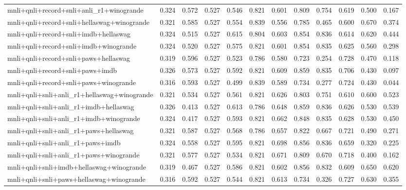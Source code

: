 \begin{table}[t]
\begin{tabular}{lrrrrrrrrrrr}
    mnli+qnli+record+snli+anli\_r1+winogrande & 0.324 & 0.572 & 0.527 & 0.546 & 0.821 & 0.601 & 0.809 & 0.754 & 0.619 & 0.500 & 0.167 \\
    mnli+qnli+record+snli+hellaswag+winogrande & 0.321 & 0.585 & 0.527 & 0.554 & 0.839 & 0.556 & 0.785 & 0.465 & 0.600 & 0.670 & 0.374 \\
    mnli+qnli+record+snli+imdb+hellaswag & 0.324 & 0.515 & 0.527 & 0.615 & 0.804 & 0.603 & 0.854 & 0.836 & 0.614 & 0.620 & 0.444 \\
    mnli+qnli+record+snli+imdb+winogrande & 0.324 & 0.520 & 0.527 & 0.575 & 0.821 & 0.601 & 0.854 & 0.835 & 0.625 & 0.560 & 0.298 \\
    mnli+qnli+record+snli+paws+hellaswag & 0.319 & 0.596 & 0.527 & 0.523 & 0.786 & 0.580 & 0.723 & 0.254 & 0.728 & 0.470 & 0.118 \\
    mnli+qnli+record+snli+paws+imdb & 0.326 & 0.573 & 0.527 & 0.592 & 0.821 & 0.609 & 0.859 & 0.835 & 0.706 & 0.430 & 0.097 \\
    mnli+qnli+record+snli+paws+winogrande & 0.316 & 0.593 & 0.527 & 0.499 & 0.839 & 0.589 & 0.734 & 0.277 & 0.724 & 0.430 & 0.044 \\
    mnli+qnli+snli+anli\_r1+hellaswag+winogrande & 0.321 & 0.534 & 0.527 & 0.561 & 0.821 & 0.626 & 0.803 & 0.751 & 0.610 & 0.600 & 0.523 \\
    mnli+qnli+snli+anli\_r1+imdb+hellaswag & 0.326 & 0.413 & 0.527 & 0.613 & 0.786 & 0.648 & 0.859 & 0.836 & 0.626 & 0.530 & 0.539 \\
    mnli+qnli+snli+anli\_r1+imdb+winogrande & 0.324 & 0.417 & 0.527 & 0.593 & 0.821 & 0.662 & 0.848 & 0.835 & 0.628 & 0.530 & 0.450 \\
    mnli+qnli+snli+anli\_r1+paws+hellaswag & 0.321 & 0.587 & 0.527 & 0.568 & 0.786 & 0.657 & 0.822 & 0.667 & 0.721 & 0.490 & 0.271 \\
    mnli+qnli+snli+anli\_r1+paws+imdb & 0.324 & 0.558 & 0.527 & 0.595 & 0.821 & 0.698 & 0.856 & 0.836 & 0.659 & 0.320 & 0.225 \\
    mnli+qnli+snli+anli\_r1+paws+winogrande & 0.321 & 0.577 & 0.527 & 0.534 & 0.821 & 0.671 & 0.809 & 0.670 & 0.718 & 0.400 & 0.162 \\
    mnli+qnli+snli+imdb+hellaswag+winogrande & 0.319 & 0.467 & 0.527 & 0.586 & 0.821 & 0.602 & 0.856 & 0.832 & 0.609 & 0.650 & 0.620 \\
    mnli+qnli+snli+paws+hellaswag+winogrande & 0.316 & 0.592 & 0.527 & 0.544 & 0.821 & 0.613 & 0.734 & 0.326 & 0.727 & 0.630 & 0.355 \\

\end{tabular}
\end{table}
